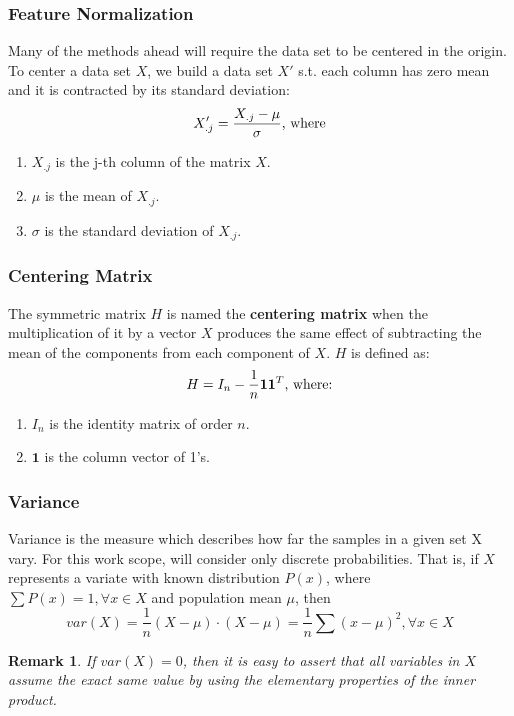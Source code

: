 \documentclass[12pt]{article}
\newtheorem{remark}{Remark}[section]
\begin{document}
\subsubsection{Feature Normalization}
Many of the methods ahead will require the data set to be centered in the origin. To center a data set $X$, we build a data set $X'$ s.t. each column has zero mean and it is contracted by its standard deviation:
$$X'_{.j} = \frac{X_{.j} - \mu}{\sigma} \textnormal{, where}$$
\begin{enumerate}
	\item $X_{.j}$ is the j-th column of the matrix $X$.
	\item $\mu$ is the mean of $X_{.j}$.
	\item $\sigma$ is the standard deviation of $X_{.j}$.
\end{enumerate}

\subsubsection{Centering Matrix}
The symmetric matrix $H$ is named the \textbf{centering matrix} when the multiplication of it by a vector $X$ produces the same effect of subtracting the mean of the components from each component of $X$. $H$ is defined as:
$$
H = I_n - \frac{1}{n}\textbf{11}^T \textnormal{, where:}
$$
\begin{enumerate}
	\item $I_n$ is the identity matrix of order $n$.
	\item $\textbf{1}$ is the column vector of 1's.
\end{enumerate}

\subsubsection{Variance}
Variance is the measure which describes how far the samples in a given set X vary. For this work scope, will consider only discrete probabilities. That is, if $X$ represents a variate with known distribution $P(x)$, where $\sum P(x) = 1, \forall x \in X$ and population mean $\mu$, then
$$
var(X) = \frac{1}{n} (X-\mu) \cdot (X-\mu) = \frac{1}{n} \sum (x - \mu)^2, \forall x \in X
$$

\begin{remark}
	If $var(X) = 0$, then it is easy to assert that all variables in $X$ assume the exact same value by using the elementary properties of the inner product.
\end{remark}
\end{document}
